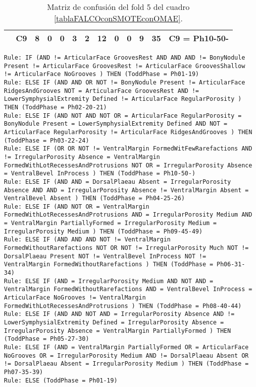\begin{table}[H]
{\begin{tabular}{|ccrrrrrrrrrrc|}
\multicolumn{1}{|c|}{}                                      & \multicolumn{1}{c|}{C9} & \multicolumn{1}{c|}{\textbf{8}}  & \multicolumn{1}{c|}{0}  & \multicolumn{1}{c|}{0}  & \multicolumn{1}{c|}{\textbf{3}}  & \multicolumn{1}{c|}{\textbf{2}}  & \multicolumn{1}{c|}{\textbf{12}} & \multicolumn{1}{c|}{0}  & \multicolumn{1}{c|}{0}  & \multicolumn{1}{c|}{\textbf{9}}  & \multicolumn{1}{c|}{\textbf{35}} & C9 = Ph10-50-     \\ \hline
\end{tabular}%
}
\caption{Matriz de confusión del fold 5 del cuadro \ref{tablaFALCOconSMOTEconOMAE}.}
\end{table}

\begin{lstlisting}
Rule: IF (AND != ArticularFace GroovesRest AND AND AND != BonyNodule Present != ArticularFace GroovesRest != ArticularFace GroovesShallow != ArticularFace NoGrooves ) THEN (ToddPhase = Ph01-19)
Rule: ELSE IF (AND AND OR NOT != BonyNodule Present != ArticularFace RidgesAndGrooves NOT = ArticularFace GroovesRest AND != LowerSymphysialExtremity Defined != ArticularFace RegularPorosity ) THEN (ToddPhase = Ph02-20-21)
Rule: ELSE IF (AND NOT AND NOT OR = ArticularFace RegularPorosity = BonyNodule Present = LowerSymphysialExtremity Defined AND NOT = ArticularFace RegularPorosity != ArticularFace RidgesAndGrooves ) THEN (ToddPhase = Ph03-22-24)
Rule: ELSE IF (OR OR NOT != VentralMargin FormedWitFewRarefactions AND != IrregularPorosity Absence = VentralMargin FormedWithLotRecessesAndProtrusions NOT OR = IrregularPorosity Absence = VentralBevel InProcess ) THEN (ToddPhase = Ph10-50-)
Rule: ELSE IF (AND AND = DorsalPlaeau Absent = IrregularPorosity Absence AND AND = IrregularPorosity Absence != VentralMargin Absent = VentralBevel Absent ) THEN (ToddPhase = Ph04-25-26)
Rule: ELSE IF (AND NOT OR = VentralMargin FormedWithLotRecessesAndProtrusions AND = IrregularPorosity Medium AND = VentralMargin PartiallyFormed = IrregularPorosity Medium = IrregularPorosity Medium ) THEN (ToddPhase = Ph09-45-49)
Rule: ELSE IF (AND AND AND NOT != VentralMargin FormedWithoutRarefactions NOT OR NOT != IrregularPorosity Much NOT != DorsalPlaeau Present NOT != VentralBevel InProcess NOT != VentralMargin FormedWithoutRarefactions ) THEN (ToddPhase = Ph06-31-34)
Rule: ELSE IF (AND = IrregularPorosity Medium AND NOT AND = VentralMargin FormedWithoutRarefactions AND = VentralBevel InProcess = ArticularFace NoGrooves != VentralMargin FormedWithLotRecessesAndProtrusions ) THEN (ToddPhase = Ph08-40-44)
Rule: ELSE IF (AND AND NOT AND = IrregularPorosity Absence AND != LowerSymphysialExtremity Defined = IrregularPorosity Absence = IrregularPorosity Absence = VentralMargin PartiallyFormed ) THEN (ToddPhase = Ph05-27-30)
Rule: ELSE IF (AND = VentralMargin PartiallyFormed OR = ArticularFace NoGrooves OR = IrregularPorosity Medium AND != DorsalPlaeau Absent OR != DorsalPlaeau Absent = IrregularPorosity Medium ) THEN (ToddPhase = Ph07-35-39)
Rule: ELSE (ToddPhase = Ph01-19)
\end{lstlisting}



